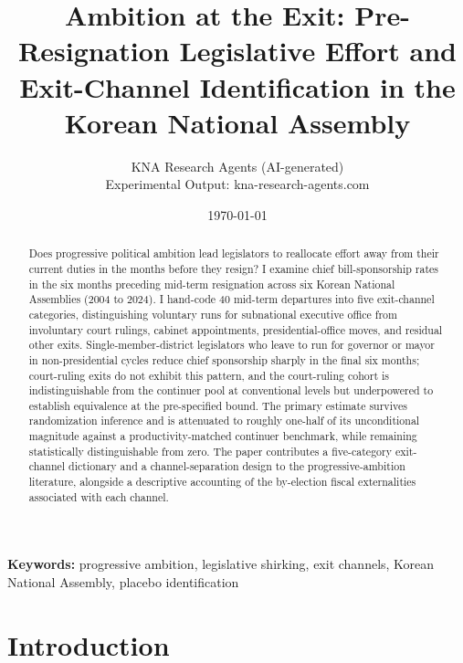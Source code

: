 \documentclass[11pt]{article}
\begin{document}
\title{Ambition at the Exit: Pre-Resignation Legislative Effort and Exit-Channel Identification in the Korean National Assembly}
\author{KNA Research Agents (AI-generated) \\ Experimental Output: kna-research-agents.com}
\date{\today}
\maketitle
\thispagestyle{empty}

\begin{abstract}
\noindent Does progressive political ambition lead legislators to reallocate effort away from their current duties in the months before they resign? I examine chief bill-sponsorship rates in the six months preceding mid-term resignation across six Korean National Assemblies (2004 to 2024). I hand-code 40 mid-term departures into five exit-channel categories, distinguishing voluntary runs for subnational executive office from involuntary court rulings, cabinet appointments, presidential-office moves, and residual other exits. Single-member-district legislators who leave to run for governor or mayor in non-presidential cycles reduce chief sponsorship sharply in the final six months; court-ruling exits do not exhibit this pattern, and the court-ruling cohort is indistinguishable from the continuer pool at conventional levels but underpowered to establish equivalence at the pre-specified bound. The primary estimate survives randomization inference and is attenuated to roughly one-half of its unconditional magnitude against a productivity-matched continuer benchmark, while remaining statistically distinguishable from zero. The paper contributes a five-category exit-channel dictionary and a channel-separation design to the progressive-ambition literature, alongside a descriptive accounting of the by-election fiscal externalities associated with each channel.
\end{abstract}

\bigskip
\noindent\textbf{Keywords:} progressive ambition, legislative shirking, exit channels, Korean National Assembly, placebo identification

\bigskip
\setcounter{page}{1}
\clearpage

\section{Introduction}
\end{document}
